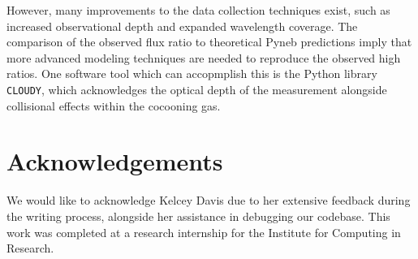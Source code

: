 \documentclass[letterpaper]{aastex701}
\begin{document}
However, many improvements to the data collection techniques exist, such as increased observational depth and expanded wavelength coverage. The comparison of the observed flux ratio to theoretical Pyneb predictions imply that more advanced modeling techniques are needed to reproduce the observed high ratios. One software tool which can accopmplish this is the Python library \texttt{CLOUDY}, which acknowledges the optical depth of the measurement alongside collisional effects within the cocooning gas.

\section{Acknowledgements}

We would like to acknowledge Kelcey Davis due to her extensive feedback during the writing process, alongside her assistance in debugging our codebase. This work was completed at a research internship for the Institute for Computing in Research.

{}

\end{document}
